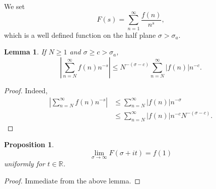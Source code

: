 \documentclass[12pt]{article}
\theoremstyle{thmstyle}
\newtheorem{lemma}[theorem]{Lemma}
\newtheorem{proposition}[theorem]{Proposition}
\theoremstyle{defstyle}
\newcommand{\R}{\mathbb{R}}
\renewcommand{\le}{\leqslant}
\renewcommand{\ge}{\geqslant}
\begin{document}
We set 
\begin{equation*}
    F(s) = \sum_{n = 1}^\infty \frac{f(n)}{n^s},
\end{equation*}
which is a well defined function on the half plane $\sigma > \sigma_a$.

\begin{lemma}
    If $N\ge 1$ and $\sigma\ge c > \sigma_a$, 
    \begin{equation*}
        \left|\sum_{n = N}^\infty f(n)n^{-s}\right|\le N^{-(\sigma - c)}\sum_{n = N}^\infty |f(n)|n^{-c}.
    \end{equation*}
\end{lemma}
\begin{proof}
    Indeed, 
    \begin{align*}
        \left|\sum_{n = N}^\infty f(n)n^{-s}\right| &\le \sum_{n = N}^\infty |f(n)|n^{-\sigma}\\
        &\le\sum_{n = N}^\infty |f(n)|n^{-c} N^{-(\sigma - c)}.
    \end{align*}
\end{proof}

\begin{proposition}
    \begin{equation*}
        \lim_{\sigma\to\infty} F(\sigma + it) = f(1)
    \end{equation*}
    uniformly for $t\in\R$.
\end{proposition}
\begin{proof}
    Immediate from the above lemma.
\end{proof}
\end{document}

